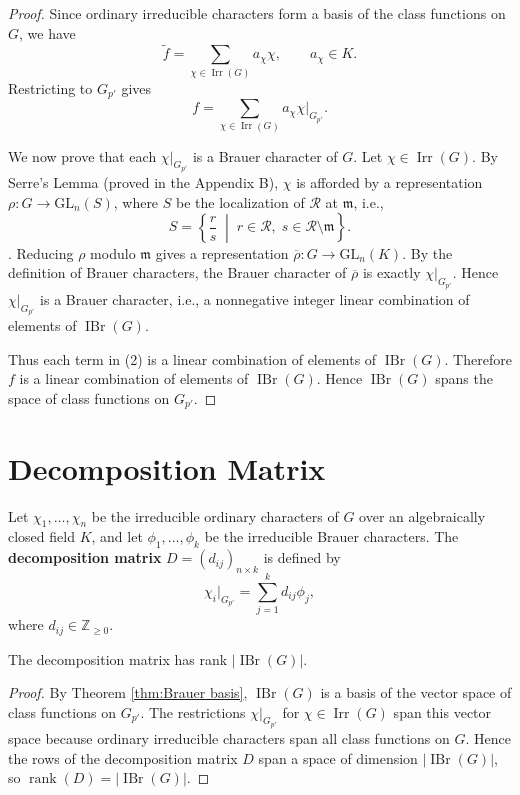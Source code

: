\begin{proof}
Since ordinary irreducible characters form a basis of the class functions on \(G\), we have
\[
\tilde{f} = \sum_{\chi \in \operatorname{Irr}(G)} a_\chi \chi, \qquad a_\chi \in K.
\]
Restricting to \(G_{p'}\) gives
\[
f = \sum_{\chi \in \operatorname{Irr}(G)} a_\chi \chi|_{G_{p'}}. \tag{2}
\]

We now prove that each \(\chi|_{G_{p'}}\) is a Brauer character of \(G\). Let \(\chi \in \operatorname{Irr}(G)\). By Serre's Lemma (proved in the Appendix B), \(\chi\) is afforded by a representation \(\rho: G \to \mathrm{GL}_n(S)\), where \(S\) be the localization of \(\mathcal{R}\) at \(\mathfrak{m}\), i.e.,
\[
S = \left\{ \frac{r}{s} \;\middle|\; r \in \mathcal{R},\; s \in \mathcal{R} \setminus \mathfrak{m} \right\}.
\]. Reducing \(\rho\) modulo \(\mathfrak{m}\) gives a representation \(\overline{\rho}: G \to \mathrm{GL}_n(K)\). By the definition of Brauer characters, the Brauer character of \(\overline{\rho}\) is exactly \(\chi|_{G_{p'}}\). Hence \(\chi|_{G_{p'}}\) is a Brauer character, i.e., a nonnegative integer linear combination of elements of \(\operatorname{IBr}(G)\).

Thus each term in (2) is a linear combination of elements of \(\operatorname{IBr}(G)\). Therefore \(f\) is a linear combination of elements of \(\operatorname{IBr}(G)\). Hence \(\operatorname{IBr}(G)\) spans the space of class functions on \(G_{p'}\).


\end{proof}

\section{Decomposition Matrix}

\begin{defn}
Let \(\chi_1, \dots, \chi_n\) be the irreducible ordinary characters of \(G\) over an algebraically closed field $K$, and let \(\phi_1, \dots, \phi_k\) be the irreducible Brauer characters. The \textbf{decomposition matrix} \(D = (d_{ij})_{n\times k}\) is defined by
\[
\chi_i|_{G_{p'}} = \sum_{j=1}^k d_{ij} \phi_j,
\]
where \(d_{ij} \in \mathbb{Z}_{\ge 0}\).
\end{defn}

\begin{prop}
The decomposition matrix has rank \(|\operatorname{IBr}(G)|\).
\end{prop}

\begin{proof}
By Theorem \ref{thm:Brauer basis}, \(\operatorname{IBr}(G)\) is a basis of the vector space of class functions on \(G_{p'}\).
The restrictions \(\chi|_{G_{p'}}\) for \(\chi \in \operatorname{Irr}(G)\) span this vector space because ordinary irreducible characters span all class functions on \(G\).
Hence the rows of the decomposition matrix \(D\) span a space of dimension \(|\operatorname{IBr}(G)|\), so \(\operatorname{rank}(D) = |\operatorname{IBr}(G)|\).
\end{proof}

